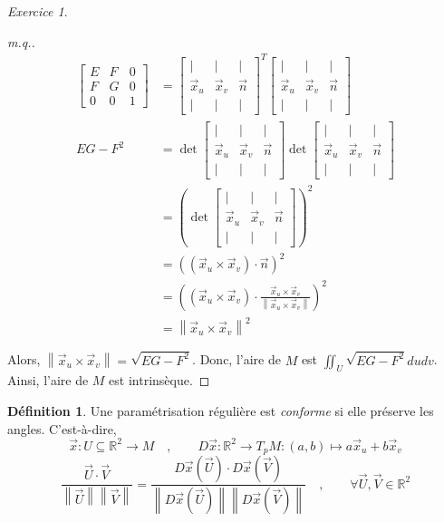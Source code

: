 \documentclass{report}
\theoremstyle{definition}
\newtheorem*{dfn}{D\'efinition}
\theoremstyle{remark}
\newtheorem*{exer}{Exercice}
\def\RR{\mathbb{R}}
\newcommand*{\norme}[1]{\left\|#1\right\|}
\begin{document}
\begin{exer}
\begin{proof}[m.q.]
			\begin{align*}
				\begin{bmatrix}
					E&F&0\\
					F&G&0\\
					0&0&1
				\end{bmatrix}&= \begin{bmatrix}
					|&|&|\\
					\vec x_u&\vec x_v&\vec n\\
					|&|&|
				\end{bmatrix}^T \begin{bmatrix}
					|&|&|\\
					\vec x_u&\vec x_v&\vec n\\
					|&|&|
				\end{bmatrix}\\
				EG-F^2&= \det\begin{bmatrix}
					|&|&|\\
					\vec x_u&\vec x_v&\vec n\\
					|&|&|
				\end{bmatrix} \det\begin{bmatrix}
					|&|&|\\
					\vec x_u&\vec x_v&\vec n\\
					|&|&|
				\end{bmatrix}\\
				&= \left(\det\begin{bmatrix}
					|&|&|\\
					\vec x_u&\vec x_v&\vec n\\
					|&|&|
				\end{bmatrix}\right)^2\\
				&= \left( (\vec x_u\times \vec x_v)\cdot \vec n \right)^2\\
				&= \left( (\vec x_u\times \vec x_v) \cdot \frac{\vec x_u\times \vec x_v}{\norme{\vec x_u\times \vec x_v}} \right)^2\\
				&= \norme{\vec x_u\times \vec x_v}^2
			\end{align*}

			Alors, $\norme{\vec x_u\times \vec x_v}=\sqrt{EG-F^2}$. Donc, l'aire de $M$ est $\iint_U\sqrt{EG-F^2}dudv$. Ainsi, l'aire de $M$ est intrins\`eque.
		\end{proof}
	\end{exer}

	\begin{dfn}
		Une param\'etrisation r\'eguli\`ere est \emph{conforme} si elle pr\'eserve les angles. C'est-\`a-dire, \[ \vec x:U\subseteq\RR^2\to M \quad,\qquad D\vec x:\RR^2\to T_pM:(a,b)\mapsto a\vec x_u+b\vec x_v \] \[ \frac{\vec U\cdot\vec V}{\norme{\vec U}\norme{\vec V}} = \frac{D\vec x(\vec U)\cdot D\vec x(\vec V)}{\norme{D\vec x(\vec U)} \norme{D\vec x(\vec V)}} \quad,\qquad \forall \vec U,\vec V\in\RR^2 \]
	\end{dfn}
\end{document}
